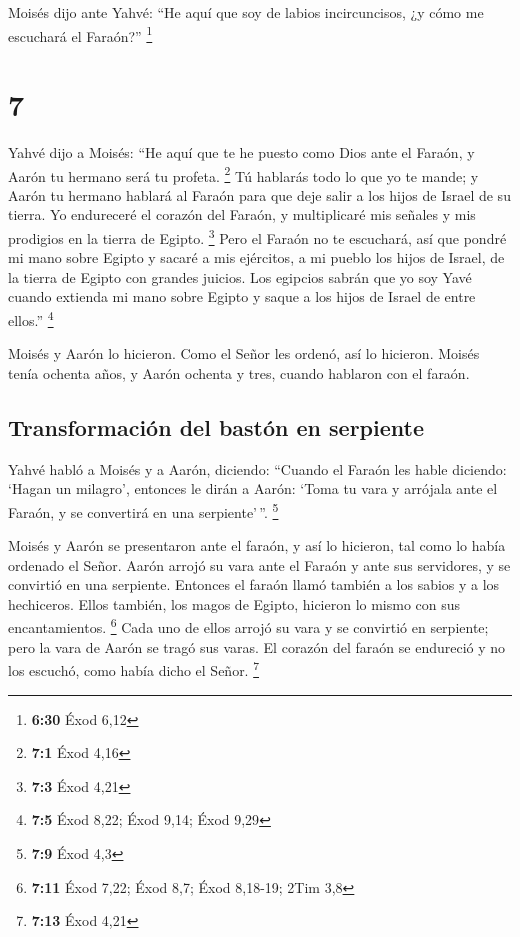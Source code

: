  Moisés dijo ante Yahvé: ``He aquí que soy de labios
incircuncisos, ¿y cómo me escuchará el Faraón?'' \footnote{\textbf{6:30}
  Éxod 6,12}

\hypertarget{section-6}{%
\section{7}\label{section-6}}

 Yahvé dijo a Moisés: ``He aquí que te he puesto como Dios
ante el Faraón, y Aarón tu hermano será tu profeta. \footnote{\textbf{7:1}
  Éxod 4,16}  Tú hablarás todo lo que yo te mande; y Aarón
tu hermano hablará al Faraón para que deje salir a los hijos de Israel
de su tierra.  Yo endureceré el corazón del Faraón, y
multiplicaré mis señales y mis prodigios en la tierra de Egipto.
\footnote{\textbf{7:3} Éxod 4,21}  Pero el Faraón no te
escuchará, así que pondré mi mano sobre Egipto y sacaré a mis ejércitos,
a mi pueblo los hijos de Israel, de la tierra de Egipto con grandes
juicios.  Los egipcios sabrán que yo soy Yavé cuando
extienda mi mano sobre Egipto y saque a los hijos de Israel de entre
ellos.'' \footnote{\textbf{7:5} Éxod 8,22; Éxod 9,14; Éxod 9,29}

 Moisés y Aarón lo hicieron. Como el Señor les ordenó, así
lo hicieron.  Moisés tenía ochenta años, y Aarón ochenta y
tres, cuando hablaron con el faraón.

\hypertarget{transformaciuxf3n-del-bastuxf3n-en-serpiente}{%
\subsection{Transformación del bastón en
serpiente}\label{transformaciuxf3n-del-bastuxf3n-en-serpiente}}

 Yahvé habló a Moisés y a Aarón, diciendo: 
``Cuando el Faraón les hable diciendo: `Hagan un milagro', entonces le
dirán a Aarón: `Toma tu vara y arrójala ante el Faraón, y se convertirá
en una serpiente'\,''. \footnote{\textbf{7:9} Éxod 4,3}

 Moisés y Aarón se presentaron ante el faraón, y así lo
hicieron, tal como lo había ordenado el Señor. Aarón arrojó su vara ante
el Faraón y ante sus servidores, y se convirtió en una serpiente.
 Entonces el faraón llamó también a los sabios y a los
hechiceros. Ellos también, los magos de Egipto, hicieron lo mismo con
sus encantamientos. \footnote{\textbf{7:11} Éxod 7,22; Éxod 8,7; Éxod
  8,18-19; 2Tim 3,8}  Cada uno de ellos arrojó su vara y
se convirtió en serpiente; pero la vara de Aarón se tragó sus varas.
 El corazón del faraón se endureció y no los escuchó,
como había dicho el Señor. \footnote{\textbf{7:13} Éxod 4,21}

